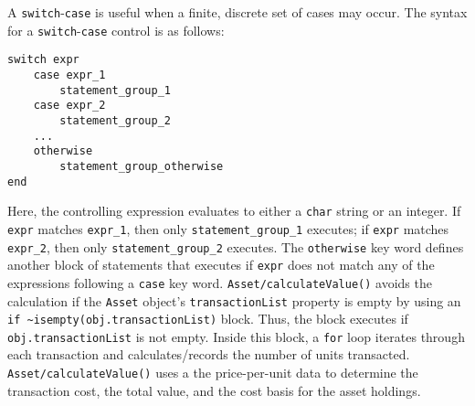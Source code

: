 A \texttt{switch}-\texttt{case} is useful when a finite, discrete set of cases may occur. The syntax for a \texttt{switch}-\texttt{case} control is as follows:
\begin{lstlisting}[style=Matlab-editor]
switch expr
	case expr_1
		statement_group_1
	case expr_2
		statement_group_2
	...
	otherwise
		statement_group_otherwise
end
\end{lstlisting}
Here, the controlling expression evaluates to either a \texttt{char} string or an integer. If \texttt{expr} matches \verb!expr_1!, then only \verb!statement_group_1! executes; if \texttt{expr} matches \verb!expr_2!, then only \verb!statement_group_2! executes. The \texttt{otherwise} key word defines another block of statements that executes if \texttt{expr} does not match any of the expressions following a \texttt{case} key word. \texttt{Asset/calculateValue()} avoids the calculation if the \texttt{Asset} object's \texttt{transactionList} property is empty by using an \verb!if ~isempty(obj.transactionList)! block. Thus, the block executes if \texttt{obj.transactionList} is not empty. Inside this block, a \texttt{for} loop iterates through each transaction and calculates/records the number of units transacted. \texttt{Asset/calculateValue()} uses a the price-per-unit data to determine the transaction cost, the total value, and the cost basis for the asset holdings.

 
